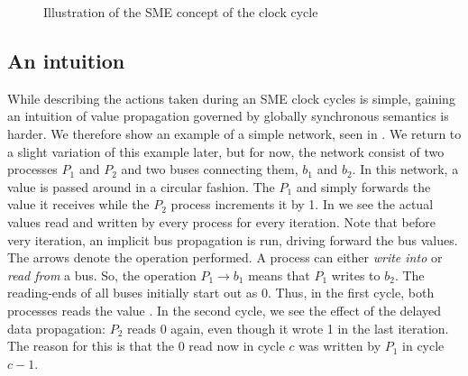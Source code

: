 \begin{figure}
  \centering
{}
\caption{Illustration of the SME concept of the clock cycle}
\label{fig:smeclock}
\end{figure}






\subsection{An intuition}
While describing the actions taken during an SME clock cycles is simple, gaining
an intuition of value propagation governed by globally synchronous semantics is
harder. We therefore show an example of a simple network, seen in
. We return to a slight variation of this example later, but
for now, the network consist of two processes $P_1$ and $P_2$ and two buses
connecting them, $b_1$ and $b_2$. In this network, a value is passed around in a
circular fashion. The $P_1$ and simply forwards the value it receives while the
$P_2$ process increments it by 1. In  we see the actual values
read and written by every process for every iteration. Note that before very
iteration, an implicit bus propagation is run, driving forward the bus
values. The arrows denote the operation performed. A process can either
{\itshape write into} or {\itshape read from} a bus. So, the operation
$P_1 \rightarrow b_1$ means that $P_1$ writes to $b_2$. The reading-ends of all
buses initially start out as 0. Thus, in the first cycle, both processes reads
the value . In the second cycle, we see the effect of the delayed data
propagation: $P_2$ reads 0 again, even though it wrote 1 in the last
iteration. The reason for this is that the 0 read now in cycle $c$ was written
by $P_1$ in cycle $c-1$.


